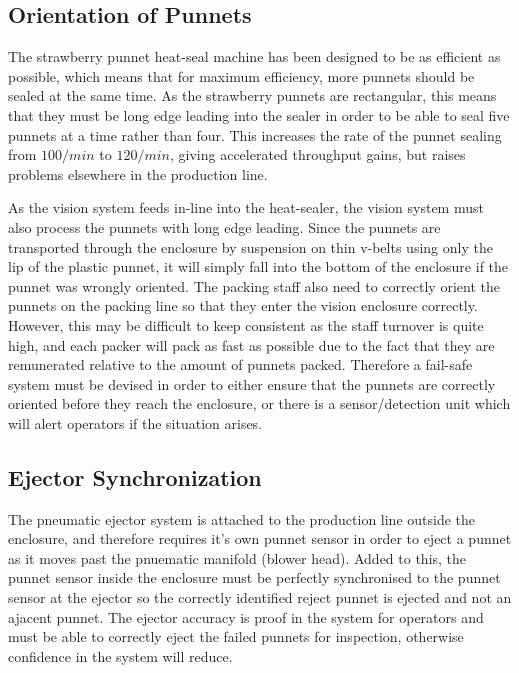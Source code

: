 \documentclass[fleqn,twoside,12pt]{report}
\begin{document}
\subsection{Orientation of Punnets}

The strawberry punnet heat-seal machine has been designed to be as efficient as possible, which means that for maximum efficiency, more punnets should be sealed at the same time. As the strawberry punnets are rectangular, this means that they must be long edge leading into the sealer in order to be able to seal five punnets at a time rather than four. This increases the rate of the punnet sealing from $100/min$ to $120/min$, giving accelerated throughput gains, but raises problems elsewhere in the production line. 

As the vision system feeds in-line into the heat-sealer, the vision system must also process the punnets with long edge leading. Since the punnets are transported through the enclosure by suspension on thin v-belts using only the lip of the plastic punnet, it will simply fall into the bottom of the enclosure if the punnet was wrongly oriented. The packing staff also need to correctly orient the punnets on the packing line so that they enter the vision enclosure correctly. However, this may be difficult to keep consistent as the staff turnover is quite high, and each packer will pack as fast as possible due to the fact that they are remunerated relative to the amount of punnets packed. Therefore a fail-safe system must be devised in order to either ensure that the punnets are correctly oriented before they reach the enclosure, or there is a sensor/detection unit which will alert operators if the situation arises.


\subsection{Ejector Synchronization}

The pneumatic ejector system is attached to the production line outside the enclosure, and therefore requires it's own punnet sensor in order to eject a punnet as it moves past the pnuematic manifold (blower head). Added to this, the punnet sensor inside the enclosure must be perfectly synchronised to the punnet sensor at the ejector so the correctly identified reject punnet is ejected and not an ajacent punnet. The ejector accuracy is proof in the system for operators and must be able to correctly eject the failed punnets for inspection, otherwise confidence in the system will reduce.
\end{document}
